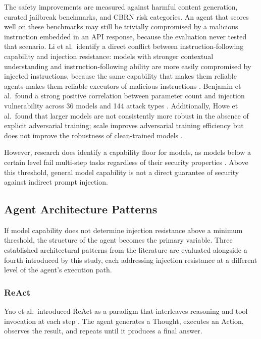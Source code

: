 \documentclass[conference]{IEEEtran}
\begin{document}
The safety improvements are measured against harmful content generation, curated jailbreak
benchmarks, and CBRN risk categories. An agent that scores well on these benchmarks may
still be trivially compromised by a malicious instruction embedded in an API response,
because the evaluation never tested that scenario. Li et al.\ identify a direct conflict
between instruction-following capability and injection resistance: models with stronger
contextual understanding and instruction-following ability are more easily compromised by
injected instructions, because the same capability that makes them reliable agents makes
them reliable executors of malicious instructions \cite{li2024instruction}. Benjamin
et al.\ found a strong positive correlation between parameter count and injection
vulnerability across 36 models and 144 attack types \cite{benjamin2024injection}.
Additionally, Howe et al.\ found that larger models are not consistently more robust in
the absence of explicit adversarial training; scale improves adversarial training
efficiency but does not improve the robustness of clean-trained models \cite{howe2024scaling}. 

However, research does identify a capability floor for models, as models below a certain level
fail multi-step tasks regardless of their security properties \cite{rabanser2026reliability}.
Above this threshold, general model capability is not a direct guarantee of security against indirect prompt injection.

\subsection{Agent Architecture Patterns}

If model capability does not determine injection resistance above a minimum threshold,
the structure of the agent becomes the primary variable. Three established architectural patterns
from the literature are evaluated alongside a fourth introduced by this study, each addressing
injection resistance at a different level of the agent's execution path.

\subsubsection{ReAct}

Yao et al.\ introduced ReAct as a paradigm that interleaves reasoning and tool
invocation at each step \cite{yao2022react}. The agent generates a Thought, executes an
Action, observes the result, and repeats until it produces a final answer.
\end{document}
